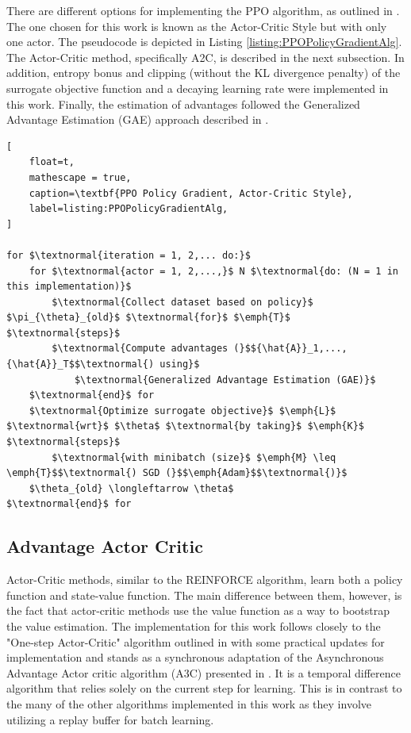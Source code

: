 \documentclass[conference]{IEEEtran}
\begin{document}
There are different options for implementing the PPO algorithm, as outlined in \cite{schulman2017proximal}. The one chosen for this work is known as the Actor-Critic Style but with only one actor. The pseudocode is depicted in Listing \ref{listing:PPOPolicyGradientAlg}. The Actor-Critic method, specifically A2C, is described in the next subsection. In addition, entropy bonus and clipping (without the KL divergence penalty) of the surrogate objective function and a decaying learning rate were implemented in this work. Finally, the estimation of advantages followed the Generalized Advantage Estimation (GAE) approach described in \cite{schulman2018highdimensional}.

\begin{lstlisting}[
    float=t,
    mathescape = true,
    caption=\textbf{PPO Policy Gradient, Actor-Critic Style},
    label=listing:PPOPolicyGradientAlg,
]

for $\textnormal{iteration = 1, 2,... do:}$
    for $\textnormal{actor = 1, 2,...,}$ N $\textnormal{do: (N = 1 in this implementation)}$
        $\textnormal{Collect dataset based on policy}$ $\pi_{\theta}_{old}$ $\textnormal{for}$ $\emph{T}$ $\textnormal{steps}$
        $\textnormal{Compute advantages (}$${\hat{A}}_1,..., {\hat{A}}_T$$\textnormal{) using}$
            $\textnormal{Generalized Advantage Estimation (GAE)}$
    $\textnormal{end}$ for
    $\textnormal{Optimize surrogate objective}$ $\emph{L}$ $\textnormal{wrt}$ $\theta$ $\textnormal{by taking}$ $\emph{K}$ $\textnormal{steps}$
        $\textnormal{with minibatch (size}$ $\emph{M} \leq \emph{T}$$\textnormal{) SGD (}$$\emph{Adam}$$\textnormal{)}$
    $\theta_{old} \longleftarrow \theta$
$\textnormal{end}$ for

\end{lstlisting}

\subsection{Advantage Actor Critic}
Actor-Critic methods, similar to the REINFORCE algorithm, learn both a policy function and state-value function.
The main difference between them, however, is the fact that actor-critic methods use the value function as a way to bootstrap the value estimation.
The implementation for this work follows closely to the "One-step Actor-Critic" algorithm outlined in \cite{ReinforcementLearningBook} with some practical updates for implementation and stands as a synchronous adaptation of the Asynchronous Advantage Actor critic algorithm (A3C) presented in \cite{mnih2016asynchronous}.
It is a temporal difference algorithm that relies solely on the current step for learning.
This is in contrast to the many of the other algorithms implemented in this work as they involve utilizing a replay buffer for batch learning.
\end{document}
